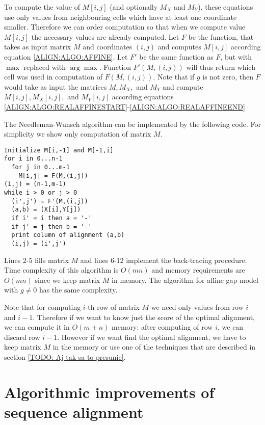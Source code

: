 To compute the
value of $M[i,j]$ (and optionally $M_X$ and $M_Y$), these equations use only values
from neighbouring cells which have at least one coordinate smaller. 
Therefore we can order computation so that when we compute value $M[i,j]$ the
necessary values are already computed.
Let $F$ be
the function, that takes as input matrix $M$  and coordinates $(i,j)$ and computes $M[i,j]$ according equation
\ref{ALIGN:ALGO:AFFINE}.  Let $F'$ be the
same function as $F$, but with $\max$ replaced with $\arg\max$.  Function
$F'(M,(i,j))$ will thus return which cell was used in computation of $F(M,(i,j))$.
Note that if $g$ is not zero, then $F$ would take as input the matrices $M,M_X,$
and $M_Y$ and compute $M[i,j],M_X[i,j],$ and $M_Y[i,j]$ according 
 equations
\ref{ALIGN:ALGO:REALAFFINESTART}-\ref{ALIGN:ALGO:REALAFFINEEND}

The Needleman-Wunsch algorithm can be implemented by the following code. For simplicity 
we show only computation of matrix $M$.

\lstset{showstringspaces=false}
\begin{lstlisting}
Initialize M[i,-1] and M[-1,i]
for i in 0...n-1
  for j in 0...m-1
    M[i,j] = F(M,(i,j))
(i,j) = (n-1,m-1)
while i > 0 or j > 0
  (i',j') = F'(M,(i,j))
  (a,b) = (X[i],Y[j])
  if i' = i then a = '-'
  if j' = j then b = '-'
  print column of alignment (a,b)
  (i,j) = (i',j')
\end{lstlisting}

Lines 2-5 fills matrix $M$ and lines 6-12 implement the back-tracing procedure.
Time complexity of this algorithm is $O(mn)$ and memory requirements are $O(mn)$
since we keep matrix $M$ in memory. The algorithm for
affine gap model with $g\not=0$ has the same complexity.


Note that for computing  $i$-th row of matrix $M$ we need only values from row
$i$ and $i-1$. Therefore if we want to know just the score of the optimal
alignment,
we can compute it in $O(m+n)$ memory: after computing of row $i$, we can discard
row $i-1$. However if we want find the optimal alignment, we have to keep matrix
$M$ in the memory or use one of the techniques that are described in section 
\ref{TODO: Aj tak sa to presunie}.


\section{Algorithmic improvements of sequence alignment}  

